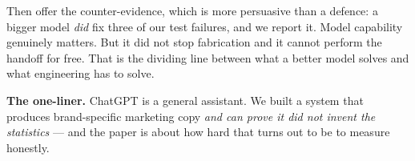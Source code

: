 \documentclass[11pt]{article}
\begin{document}
Then offer the counter-evidence, which is more persuasive than a defence: a
bigger model \emph{did} fix three of our test failures, and we report it. Model
capability genuinely matters. But it did not stop fabrication and it cannot
perform the handoff for free. That is the dividing line between what a better
model solves and what engineering has to solve.

\begin{callout}
\textbf{The one-liner.} ChatGPT is a general assistant. We built a system that
produces brand-specific marketing copy \emph{and can prove it did not invent
the statistics} --- and the paper is about how hard that turns out to be to
measure honestly.
\end{callout}
\end{document}
